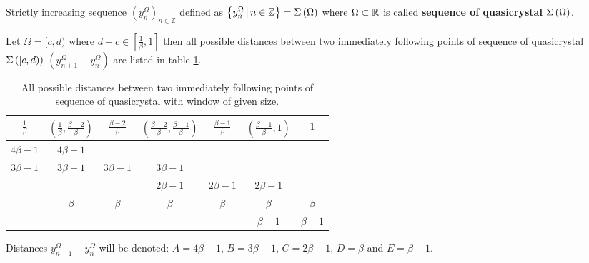 \documentclass[text.tex]{subfiles}
\begin{document}
\begin{definition}
Strictly increasing sequence $(y_n^\Omega)_{n\in \mathbb{Z}}$ defined as $\left\{y_n^\Omega\,|\, n\in\mathbb{Z} \right\} = \Sigma\left(\Omega\right)$ where $\Omega \subset \mathbb{R}$ is called \textbf{sequence of quasicrystal $\Sigma\left(\Omega\right)$}.
\end{definition}

\begin{theorem}
\label{the:spaces:sum}
Let $\Omega = [c,d)$ where $d-c \in \left[ \frac{1}{\beta}, 1 \right]$ then all possible distances between two immediately following points of sequence of quasicrystal $\Sigma\left([c,d)\right)$ $\left(y_{n+1}^\Omega-y_n^\Omega\right)$ are listed in table \ref{table:spaces}.
\begin{table}[h]
\begin{center}
\begin{tabular}{ccccccc}
	\toprule
		$\frac{1}{\beta}$	&	$\left( \frac{1}{\beta}, \frac{\beta - 2}{\beta} \right)$	&	$\frac{\beta-2}{\beta}$	&	$\left( \frac{\beta-2}{\beta}, \frac{\beta-1}{\beta} \right)$	&	$\frac{\beta-1}{\beta}$	&	$\left( \frac{\beta-1}{\beta}, 1 \right)$	&	$1$\\
	\midrule
		$4\beta-1$ 	&	$4\beta-1$	&				&				&				&				&			 	\\ 
		$3\beta-1$	&	$3\beta-1$	&	$3\beta-1$	&	$3\beta-1$	&				&				&			 	\\
					&				&				&	$2\beta-1$	&	$2\beta-1$	&	$2\beta-1$	&				\\
					&	$\beta$		&	$\beta$		&	$\beta$		&	$\beta$		&	$\beta$		&	$\beta$		\\
					&				&				&				&				&	$\beta-1$	&	$\beta-1$	\\
	\bottomrule
\end{tabular}
\caption{All possible distances between two immediately following points of sequence of quasicrystal with window of given size.}
\label{table:spaces}
\end{center}
\end{table}
%
\end{theorem}

\begin{definition}
\label{def:distancesNotation}
Distances $y_{n+1}^\Omega-y_n^\Omega$ will be denoted: $A = 4\beta-1$, $B = 3\beta-1$, $C = 2\beta-1$, $D = \beta$ and $E = \beta-1$.
\end{definition}
\end{document}
